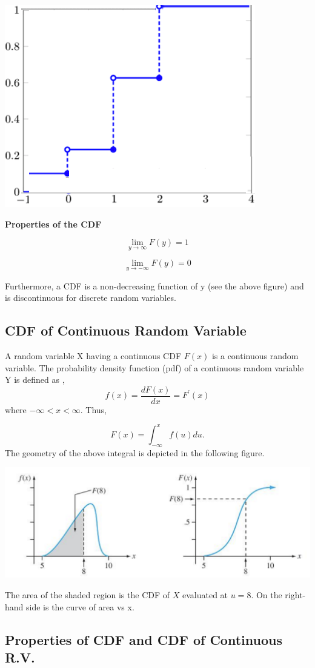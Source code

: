 \documentclass[
]{book}
\begin{document}
\begin{center}\includegraphics[width=0.3\linewidth]{topic03/CDF2CoinFigure} \end{center}

\textbf{Properties of the CDF}

\[\lim_{y \to \infty} F(y) = 1\]

\[\lim_{y \to -\infty} F(y) = 0\]

Furthermore, a CDF is a non-decreasing function of y (see the above figure) and is discontinuous for discrete random variables.

\hypertarget{cdf-of-continuous-random-variable}{%
\subsection{CDF of Continuous Random Variable}\label{cdf-of-continuous-random-variable}}

A random variable X having a continuous CDF \(F(x)\) is a continuous random variable. The probability density function (pdf) of a continuous random variable Y is defined as
,
\[
f(x) = \frac{dF(x)}{dx} = F^\prime(x)
\]
where \(-\infty < x < \infty\). Thus,

\[
F(x) = \int_{-\infty}^x f(u)du.
\]
The geometry of the above integral is depicted in the following figure.

\begin{center}\includegraphics[width=0.6\linewidth]{topic03/CDFvsPDF} \end{center}

The area of the shaded region is the CDF of \(X\) evaluated at \(u = 8\). On the right-hand side is the curve of area vs x.

\hypertarget{properties-of-cdf-and-cdf-of-continuous-r.v.}{%
\subsection{Properties of CDF and CDF of Continuous R.V.}\label{properties-of-cdf-and-cdf-of-continuous-r.v.}}
\end{document}
